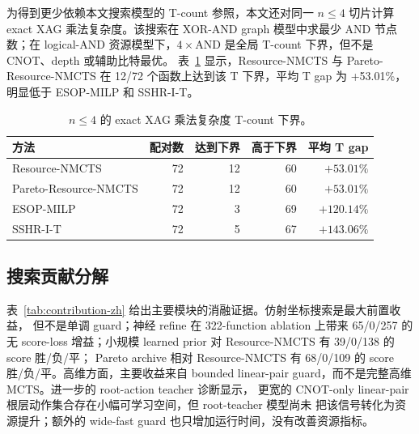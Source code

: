 \documentclass[UTF8,fontset=macnew,11pt]{ctexart}
\newcommand{\method}{Resource-NMCTS}
\newcommand{\paretomethod}{Pareto-Resource-NMCTS}
\begin{document}
为得到更少依赖本文搜索模型的 T-count 参照，本文还对同一 $n\leq 4$ 切片计算 exact
XAG 乘法复杂度。该搜索在 XOR-AND graph 模型中求最少 AND 节点数；在 logical-AND
资源模型下，$4\times$AND 是全局 T-count 下界，但不是 CNOT、depth 或辅助比特最优。
表~\ref{tab:xag-mc-zh} 显示，\method{} 与 \paretomethod{} 在 12/72 个函数上达到该
T 下界，平均 T gap 为 +53.01\%，明显低于 ESOP-MILP 和 SSHR-I-T。

\begin{table}[t]
\centering
\small
\caption{$n\leq 4$ 的 exact XAG 乘法复杂度 T-count 下界。}
\label{tab:xag-mc-zh}
\begin{tabular}{lrrrr}
\toprule
方法 & 配对数 & 达到下界 & 高于下界 & 平均 T gap \\
\midrule
\method{} & 72 & 12 & 60 & $+53.01\%$ \\
\paretomethod{} & 72 & 12 & 60 & $+53.01\%$ \\
ESOP-MILP & 72 & 3 & 69 & $+120.14\%$ \\
SSHR-I-T & 72 & 5 & 67 & $+143.06\%$ \\
\bottomrule
\end{tabular}
\end{table}

\subsection{搜索贡献分解}

表~\ref{tab:contribution-zh} 给出主要模块的消融证据。仿射坐标搜索是最大前置收益，
但不是单调 guard；神经 refine 在 322-function ablation 上带来 65/0/257 的
无 score-loss 增益；小规模 learned prior 对 \method{} 有 39/0/138 的 score 胜/负/平；
Pareto archive 相对 \method{} 有 68/0/109 的 score 胜/负/平。高维方面，主要收益来自
bounded linear-pair guard，而不是完整高维 MCTS。进一步的 root-action teacher 诊断显示，
更宽的 CNOT-only linear-pair 根层动作集合存在小幅可学习空间，但 root-teacher 模型尚未
把该信号转化为资源提升；额外的 wide-fast guard 也只增加运行时间，没有改善资源指标。
\end{document}
